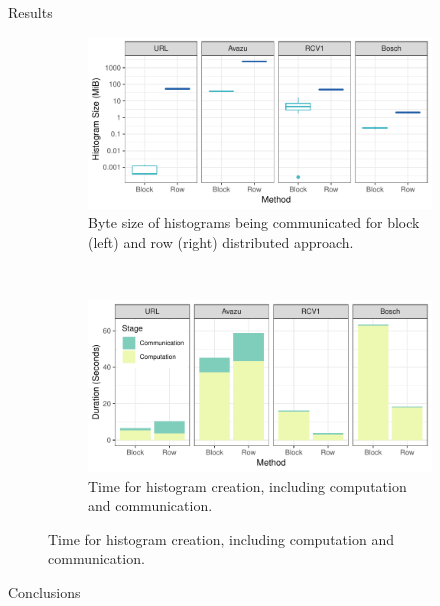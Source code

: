 \documentclass[final]{beamer}
\newlength{\onecolwid}
\begin{document}
\begin{frame}[t]
\begin{columns}[t]
\begin{column}{\onecolwid}
\begin{block}{Results}
	\begin{figure}
		\centering
		\begin{subfigure}[t]{\textwidth}
			\centering
			\includegraphics[width=\linewidth]{block-gbt-hist-box}
			\caption{Byte size of histograms being communicated for block (left) and row (right) distributed
				approach.}
		\end{subfigure}
		\\
		\vspace{15pt}
		\begin{subfigure}[t]{\textwidth}
			\centering
			\includegraphics[width=\linewidth]{block-gbt-time}
			\caption{Time for histogram creation, including computation and
				communication.}
		\end{subfigure}
	\end{figure}

	\end{block}



	
	\begin{block}{Conclusions}
	

\end{block}
\end{column}
\end{columns}
\end{frame}
\end{document}
